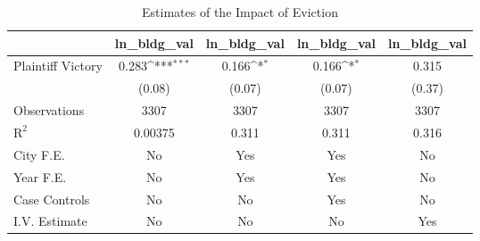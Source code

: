\begin{table}[htbp]\centering
\def\sym#1{\ifmmode^{#1}\else\(^{#1}\)\fi}
\caption{Estimates of the Impact of Eviction}
\begin{tabular}{l*{4}{c}}
\toprule
                    &\multicolumn{1}{c}{ln\_bldg\_val}&\multicolumn{1}{c}{ln\_bldg\_val}&\multicolumn{1}{c}{ln\_bldg\_val}&\multicolumn{1}{c}{ln\_bldg\_val}\\
\midrule
Plaintiff Victory   &       0.283\sym{***}&       0.166\sym{*}  &       0.166\sym{*}  &       0.315         \\
                    &      (0.08)         &      (0.07)         &      (0.07)         &      (0.37)         \\
\midrule
Observations        &        3307         &        3307         &        3307         &        3307         \\
$\text{R}^2$        &     0.00375         &       0.311         &       0.311         &       0.316         \\
City F.E.           &          No         &         Yes         &         Yes         &          No         \\
Year F.E.           &          No         &         Yes         &         Yes         &          No         \\
Case Controls       &          No         &          No         &         Yes         &          No         \\
I.V. Estimate       &          No         &          No         &          No         &         Yes         \\
\bottomrule
\end{tabular}
\end{table}
